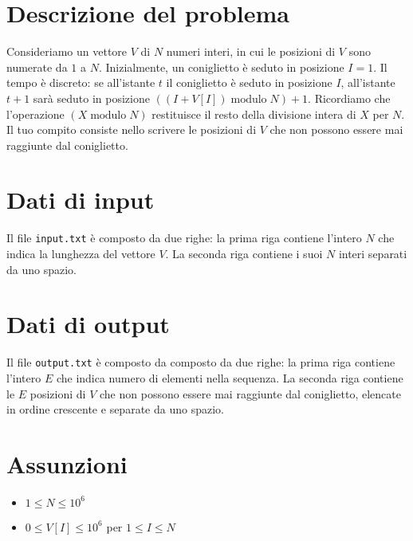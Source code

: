 \documentclass[a4paper,11pt]{article}
\begin{document}
\vspace{0.5cm}



\section*{Descrizione del problema}

Consideriamo un vettore $V$ di $N$ numeri
interi, in cui le posizioni di $V$ sono numerate da $1$ a
$N$. Inizialmente, un coniglietto è seduto in posizione
$I=1$. Il tempo è discreto: se all'istante $t$ il coniglietto
è seduto in posizione $I$, all'istante $t+1$ sarà seduto in
posizione $((I + V[I]) \operatorname{modulo} N) + 1$. Ricordiamo che
l'operazione $(X \operatorname{modulo} N)$ restituisce il resto della
divisione intera di $X$ per $N$.  Il tuo compito
consiste nello scrivere le posizioni di $V$ che non possono
essere mai raggiunte dal coniglietto.


\section*{Dati di input}

Il file \texttt{input.txt} è composto da due righe: la
prima riga contiene l'intero $N$ che indica la lunghezza del
vettore $V$. La seconda riga contiene i suoi $N$
interi separati da uno spazio.


\section*{Dati di output}

Il file \texttt{output.txt} è composto da composto da due
righe: la prima riga contiene l'intero $E$ che indica numero
di elementi nella sequenza.  La seconda riga contiene le $E$
posizioni di $V$ che non possono essere mai raggiunte dal
coniglietto, elencate in ordine crescente e separate da uno spazio.

\section*{Assunzioni}
  \begin{itemize}
    \item $1 ≤ N ≤ 10^{6}$
    \item $0 ≤ V[I] ≤ 10^{6}$ per $1 ≤ I ≤ N$
  \end{itemize}
\end{document}
